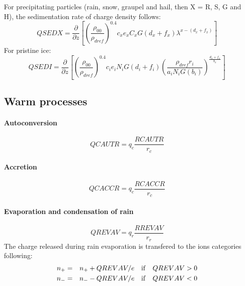 For precipitating particles (rain, snow, graupel and hail, then X = R, S, G and H), the sedimentation rate of charge density follows:
\begin{equation}
  QSEDX = \frac{\partial}{\partial z} \left[ \left( \frac{\rho _{00}}{\rho _{dref}} \right) ^{0.4} c_x e_x C_x G(d_x + f_x) \lambda ^{x - (d_x + f_x)} \right]
\end{equation}
For pristine ice:
\begin{equation}
  QSEDI = \frac{\partial}{\partial z} \left[ \left( \frac{\rho _{00}}{\rho _{dref}} \right) ^{0.4} c_i e_i N_i G(d_i + f_i) \left( \frac{\rho _{dref} r_i}{a_i N_i G(b_i)} \right) ^{\frac{d_x + f_x}{b_x}} \right]
\end{equation}

\subsection{Warm processes}

\paragraph{Autoconversion}

\begin{equation}
  QCAUTR = q_c \frac{RCAUTR}{r_c}
\end{equation}


\paragraph{Accretion}

\begin{equation}
  QCACCR = q_c \frac{RCACCR}{r_c}
\end{equation}


\paragraph{Evaporation and condensation of rain}

\begin{equation}
  QREVAV = q_r \frac{RREVAV}{r_r} 
\end{equation}
The charge released during rain evaporation is transfered to the ions categories following:
\begin{eqnarray}
  n_+ &=& n_+ + QREVAV / e \quad {\rm if} \quad QREVAV > 0 \\
  n_- &=& n_- - QREVAV / e \quad {\rm if} \quad QREVAV < 0
\end{eqnarray}

